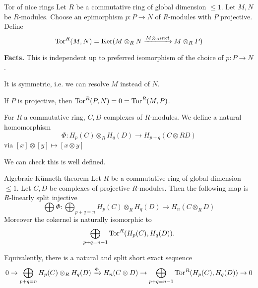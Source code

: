 \documentclass[language=english]{TemplateLecture}
\begin{document}
\begin{defi}{Tor of nice rings}{}
    Let \(R\) be a commutative ring of global dimension \(\leq 1\). Let \(M,N\) be \(R\)-modules. Choose an epimorphism \(p\colon P \to N\) of \(R\)-modules with \(P\) projective. Define
    \[\mathrm{Tor}^R(M,N) = \operatorname{Ker}(M\otimes_R N \xrightarrow{M\otimes_R incl} M\otimes_R P)\]
\end{defi}

\textbf{Facts.} This is independent up to preferred isomorphism of the choice of \(p\colon P \to N\).

It is symmetric, i.e. we can resolve \(M\) instead of \(N\).

If \(P\) is projective, then \(\mathrm{Tor}^R(P,N) = 0 = \mathrm{Tor}^R(M,P)\).

\begin{construction}
    For \(R\) a commutative ring, \(C,D\) complexes of \(R\)-modules. We define a natural homomorphism
    \[\Phi \colon H_p(C) \otimes_R H_q(D) \to H_{p+q}(C\otimes R D)\]
    via \([x] \otimes [y] \mapsto [x\otimes y]\)
\end{construction}

We can check this is well defined.

\begin{thm}{Algebraic Künneth theorem}{}
    Let \(R\) be a commutative ring of global dimension \(\leq 1\). Let \(C, D\) be complexes of projective \(R\)-modules. Then the following map is \(R\)-linearly split injective
    \[\bigoplus \Phi \colon \bigoplus_{p+q = n} H_p(C) \otimes_R H_q(D) \to H_n(C \otimes_R D)\]
    Moreover the cokernel is naturally isomorphic to
    \[\bigoplus_{p+q = n-1} \mathrm{Tor}^R(H_p(C), H_q(D)).\]

    Equivalently, there is a natural and split short exact sequence
    \[0 \to \bigoplus_{p+q = n} H_p(C) \otimes_R H_q(D) \xrightarrow{\Phi} H_n(C\otimes D) \to \bigoplus_{p+q = n-1} \mathrm{Tor}^R(H_p(C), H_q(D)) \to 0\]
\end{thm}
\end{document}
